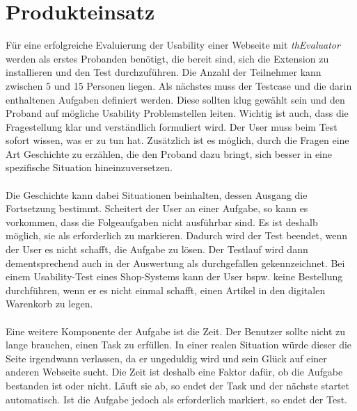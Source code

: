 %
%
%
%

\section{Produkteinsatz}

Für eine erfolgreiche Evaluierung der Usability einer Webseite mit \textit{thEvaluator} werden als erstes Probanden benötigt, die bereit sind, sich die Extension zu installieren und den Test durchzuführen. Die Anzahl der Teilnehmer kann zwischen 5 und 15 Personen liegen. Als nächstes muss der Testcase und die darin enthaltenen Aufgaben definiert werden. Diese sollten klug gewählt sein und den Proband auf mögliche Usability Problemstellen leiten. Wichtig ist auch, dass die Fragestellung klar und verständlich formuliert wird. Der User muss beim Test sofort wissen, was er zu tun hat. Zusätzlich ist es möglich, durch die Fragen eine Art Geschichte zu erzählen, die den Proband dazu bringt, sich besser in eine spezifische Situation hineinzuversetzen.\\
\\
Die Geschichte kann dabei Situationen beinhalten, dessen Ausgang die Fortsetzung bestimmt. Scheitert der User an einer Aufgabe, so kann es vorkommen, dass die Folgeaufgaben nicht ausführbar sind. Es ist deshalb möglich, sie als \glqq erforderlich\grqq{} zu markieren. Dadurch wird der Test beendet, wenn der User es nicht schafft, die Aufgabe zu lösen. Der Testlauf wird dann dementsprechend auch in der Auswertung als \glqq durchgefallen\grqq{} gekennzeichnet. Bei einem Usability-Test eines Shop-Systems kann der User bspw. keine Bestellung durchführen, wenn er es nicht einmal schafft, einen Artikel in den digitalen Warenkorb zu legen.\\
\\
Eine weitere Komponente der Aufgabe ist die Zeit. Der Benutzer sollte nicht zu lange brauchen, einen Task zu erfüllen. In einer realen Situation würde dieser die Seite irgendwann verlassen, da er ungeduldig wird und sein Glück auf einer anderen Webseite sucht. Die Zeit ist deshalb eine Faktor dafür, ob die Aufgabe bestanden ist oder nicht. Läuft sie ab, so endet der Task und der nächste startet automatisch. Ist die Aufgabe jedoch als \glqq erforderlich\grqq{} markiert, so endet der Test.\\
